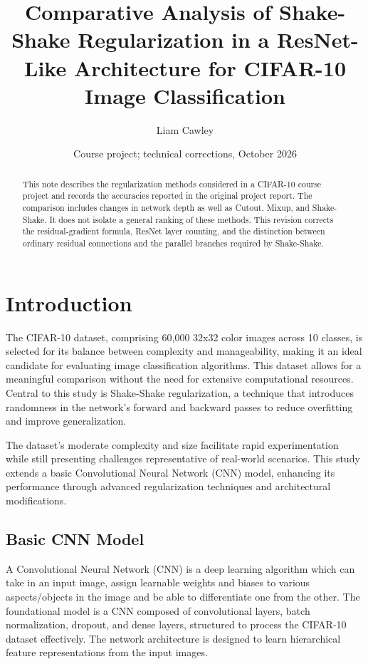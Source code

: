 \documentclass[12pt]{article}
\title{Comparative Analysis of Shake-Shake Regularization in a ResNet-Like Architecture for CIFAR-10 Image Classification}
\author{Liam Cawley}
\date{Course project; technical corrections, October 2026}
\begin{document}
\maketitle

\begin{abstract}
This note describes the regularization methods considered in a CIFAR-10 course project and records the accuracies reported in the original project report. The comparison includes changes in network depth as well as Cutout, Mixup, and Shake-Shake. It does not isolate a general ranking of these methods. This revision corrects the residual-gradient formula, ResNet layer counting, and the distinction between ordinary residual connections and the parallel branches required by Shake-Shake.
\end{abstract}

\section{Introduction}
The CIFAR-10 dataset, comprising 60,000 32x32 color images across 10 classes, is selected for its balance between complexity and manageability, making it an ideal candidate for evaluating image classification algorithms. This dataset allows for a meaningful comparison without the need for extensive computational resources. Central to this study is Shake-Shake regularization, a technique that introduces randomness in the network's forward and backward passes to reduce overfitting and improve generalization.

The dataset's moderate complexity and size facilitate rapid experimentation while still presenting challenges representative of real-world scenarios. This study extends a basic Convolutional Neural Network (CNN) model, enhancing its performance through advanced regularization techniques and architectural modifications.

\subsection{Basic CNN Model}
A Convolutional Neural Network (CNN) is a deep learning algorithm which can take in an input image, assign learnable weights and biases to various aspects/objects in the image and be able to differentiate one from the other.
The foundational model is a CNN composed of convolutional layers, batch normalization, dropout, and dense layers, structured to process the CIFAR-10 dataset effectively. The network architecture is designed to learn hierarchical feature representations from the input images.
\end{document}
